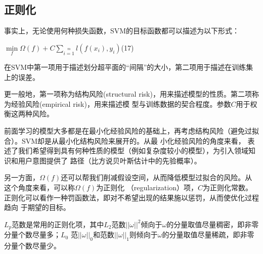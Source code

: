 \documentclass[UTF8]{ctexart}
\begin{document}
{\subsection{正则化}
事实上，无论使用何种损失函数，SVM的目标函数都可以描述为以下形式：\par
\begin{center}
    $\min\limits_f\Omega(f)+C\sum\limits_{i=1}\limits^ml(f(x_i),y_i)$\quad (17)
\end{center}
在SVM中第一项用于描述划分超平面的“间隔”的大小，第二项用于描述在训练集上的误差。\par
更一般地，第一项称为结构风险(structural risk)，用来描述模型的性质。第二项称为经验风险(empirical risk)，用来描述模
型与训练数据的契合程度。参数$C$用于权衡这两种风险。\par
前面学习的模型大多都是在最小化经验风险的基础上，再考虑结构风险（避免过拟合）。SVM却是从最小化结构风险来展开的。从最
小化经验风险的角度来看， 表述了我们希望得到具有何种性质的模型（例如复杂度较小的模型），为引入领域知识和用户意图提供了
路径（比方说贝叶斯估计中的先验概率）。\par
另一方面，$\Omega(f)$还可以帮我们削减假设空间，从而降低模型过拟合的风险。从这个角度来看，可以称$\Omega(f)$为正则化
（regularization）项，$C$为正则化常数。正则化可以看作一种罚函数法，即对不希望出现的结果施以惩罚，从而使优化过程趋向
于期望的目标。\par
$L_p$范数是常用的正则化项，其中$L_2$范数$||\omega||^2$倾向于$\omega$的分量取值尽量稠密，即非零分量个数尽量多；$L_0$
范$||\omega||_0$和范数$||\omega||_1$则倾向于$\omega$的分量取值尽量稀疏，即非零分量个数尽量少。\newpage
}
\end{document}
